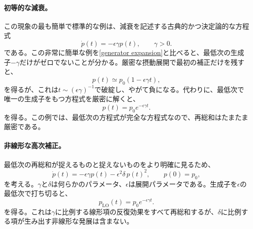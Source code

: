 \documentclass[a4paper,11pt,oneside]{article}
\theoremstyle{definition}
\numberwithin{equation}{section}
\begin{document}
\paragraph{初等的な減衰。}
この現象の最も簡単で標準的な例は、減衰を記述する古典的かつ決定論的な方程式
\begin{equation}
\dot p(t)
=
-\epsilon\gamma p(t),
\qquad
\gamma>0.
\end{equation}
である。この非常に簡単な例を\eqref{generator expansion}と比べると、最低次の生成子$ -\gamma$だけがゼロでないことが分かる。厳密な摂動展開で最初の補正だけを残すと、
\begin{equation}
p(t)
\simeq
p_{0}
\left(
1-\epsilon\gamma t
\right),
\end{equation}
を得るが、これは$t\sim(\epsilon\gamma)^{-1}$で破綻し、やがて負になる。代わりに、最低次で唯一の生成子をもつ方程式を厳密に解くと、
\begin{equation}
p(t)
=
p_{0}e^{-\epsilon\gamma t}.
\end{equation}
を得る。この例では、最低次の方程式が完全な方程式なので、再総和はたまたま厳密である。





\paragraph{非線形な高次補正。}
最低次の再総和が捉えるものと捉えないものをより明確に見るため、
\begin{equation}
\dot p(t)
=
-\epsilon\gamma p(t)
-
\epsilon^{2}\delta \, p(t)^{2},
\qquad
p(0)=p_{0},
\end{equation}
を考える。$ \gamma$と$ \delta$は何らかのパラメータ、$ \epsilon$は展開パラメータである。生成子を$ \epsilon$の最低次で打ち切ると、
\begin{equation}
p_{\mathrm{LO}}(t)
=
p_{0}e^{-\epsilon\gamma t}.
\end{equation}
を得る。これは$\gamma$に比例する線形項の反復効果をすべて再総和するが、$\delta$に比例する項が生み出す非線形な発展は含まない。
\end{document}
